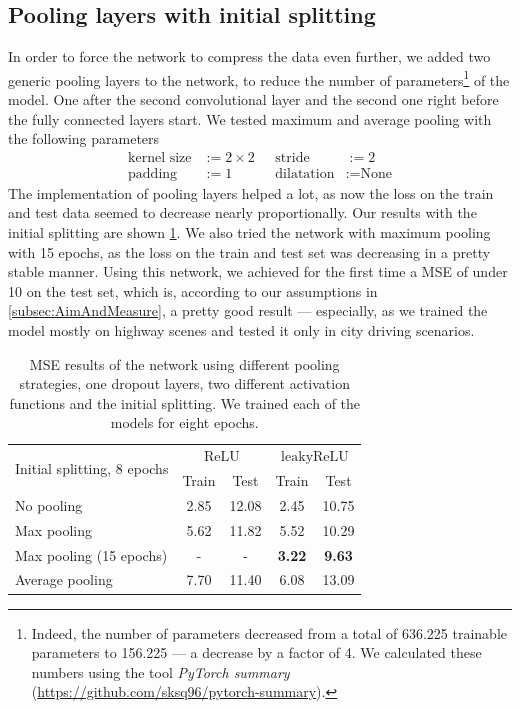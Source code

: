 \documentclass[conference]{IEEEtran}
\begin{document}
\subsection{Pooling layers with initial splitting}
In order to force the network to compress the data even further, we added two generic pooling layers to the network, to reduce the number of parameters\footnote{Indeed, 
the number of parameters decreased from a total of 636.225 trainable parameters to 156.225 --- a 
decrease by a factor of 4. We calculated these numbers using the tool \emph{PyTorch summary} 
(\url{https://github.com/sksq96/pytorch-summary}).} of the model. One after the second 
convolutional layer and the second one right before the fully connected layers start.
We tested maximum and average pooling with the following parameters
\begin{align*}
\text{kernel size} &:= 2\times 2 &\text{\ \ \ \ } \text{stride} &:= 2\\
\text{padding} &:= 1 &\text{\ \ \ }\text{dilatation} &:= \text{None}
\end{align*}
The implementation of pooling layers helped a lot, as now the loss on the train and test data seemed to 
decrease nearly proportionally. Our results with the initial splitting are shown 
\cref{tab:ResultsInitialSplitting}. We also tried the network
with maximum pooling with 15 epochs, as the loss on the train and test set was decreasing in a pretty 
stable manner. Using this network, we achieved for the first time a MSE of under 10 on the test set,
which is, according to our assumptions in \cref{subsec:AimAndMeasure}, a 
pretty good result --- especially, as we trained the model mostly on highway scenes and tested it only 
in city driving scenarios.
\begin{table}[!t]
\normalsize
\centering
\begin{tabular}{lcccc}
\toprule
\multirow{2}{*}{Initial splitting, 8 epochs}  & \multicolumn{2}{c}{$\mathrm{ReLU}$} & \multicolumn{2}{c}{$\mathrm{leakyReLU}$} \\
 & Train & Test & Train & Test\\
\midrule
No pooling & 2.85 & 12.08 & 2.45 & 10.75 \\
Max pooling & 5.62 & 11.82 & 5.52 & 10.29 \\
Max pooling (15 epochs) & - & - & \textbf{3.22} & \textbf{9.63} \\
Average pooling & 7.70 & 11.40 & 6.08 & 13.09\\
\bottomrule
\end{tabular}
\caption{MSE results of the network using different pooling strategies, one dropout layers, two different activation functions and 
the initial splitting. We trained each of the models for eight epochs.}
\label{tab:ResultsInitialSplitting}
\end{table} 
\end{document}

